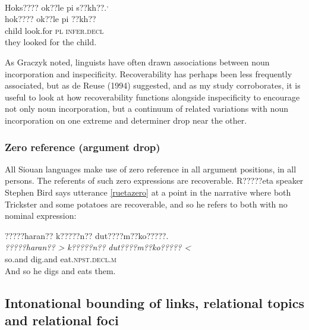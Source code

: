 \documentclass[output=paper]{LSP/langsci}
\begin{document}
\ea\label{deloriachild}
 	Hoks???? ok??le pi s??kh??.\footnotemark\textsuperscript{,} \footnotemark\\
\gll	hok????		ok??le		pi			??kh??\\
	child		look.for	\textsc{pl}		\textsc{infer.decl}\\
\glt	they looked for the child. 
\z

	As Graczyk noted, linguists have often drawn associations between noun incorporation and inspecificity. Recoverability has perhaps been less frequently associated, but as de Reuse (1994) suggested, and as my study corroborates, it is useful to look at how recoverability functions alongside inspecificity to encourage not only noun incorporation, but a continuum of related variations with noun incorporation on one extreme and determiner drop near the other.
	
\subsubsection{Zero reference (argument drop)}\label{zeroreference}

	All Siouan languages make use of zero reference in all argument positions, in all persons. The referents of such zero expressions are recoverable. R?????eta speaker Stephen Bird says utterance \ref{ruetazero} at a point in the narrative where both Trickster and some potatoes are recoverable, and so he refers to both with no nominal expression:
	
\ea\label{ruetazero}
 	?????haran?? k?????n?? dut????m??ko?????.\footnotemark\\
\gll 	\emph{?????haran?? >}	\emph{k?????n??}		\emph{dut????m??ko????? <}\\
	so.and		dig.and		eat.\textsc{npst.decl.m}\\
\glt	And so he digs and eats them.
\z

\subsection{Intonational bounding of links, relational topics and relational foci}\label{intonationalbounding}
	
\end{document}
